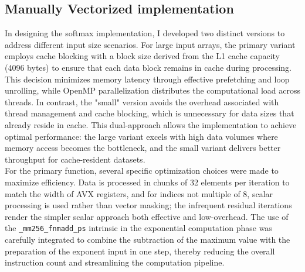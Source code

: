 \documentclass[10pt]{article}
\begin{document}
\subsection{Manually Vectorized implementation}
In designing the softmax implementation, I developed two distinct versions to address different input size scenarios. For large input arrays, the primary variant employs cache blocking with a block size derived from the L1 cache capacity (4096 bytes) to ensure that each data block remains in cache during processing. This decision minimizes memory latency through effective prefetching and loop unrolling, while OpenMP parallelization distributes the computational load across threads. In contrast, the "small" version avoids the overhead associated with thread management and cache blocking, which is unnecessary for data sizes that already reside in cache. This dual-approach allows the implementation to achieve optimal performance: the large variant excels with high data volumes where memory access becomes the bottleneck, and the small variant delivers better throughput for cache-resident datasets. \\

For the primary function, several specific optimization choices were made to maximize efficiency. Data is processed in chunks of 32 elements per iteration to match the width of AVX registers, and for indices not multiple of 8, scalar processing is used rather than vector masking; the infrequent residual iterations render the simpler scalar approach both effective and low-overhead. The use of the \texttt{\_mm256\_fnmadd\_ps} intrinsic in the exponential computation phase was carefully integrated to combine the subtraction of the maximum value with the preparation of the exponent input in one step, thereby reducing the overall instruction count and streamlining the computation pipeline.
\end{document}
